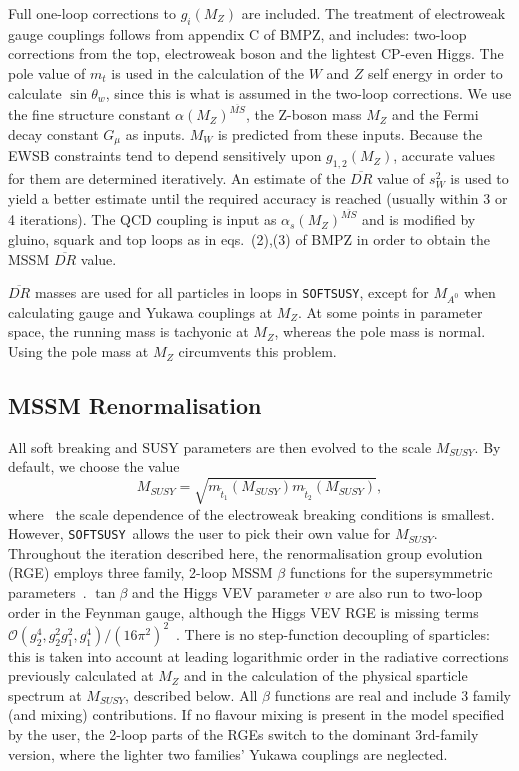 \documentclass{article}
\def\SOFTSUSY{{\tt SOFTSUSY}}
\begin{document}
Full one-loop corrections to $g_i(M_Z)$ are
included. 
The treatment of electroweak gauge couplings follows
from appendix C of BMPZ, and includes: two-loop corrections 
from the top, electroweak boson and the lightest CP-even Higgs. The pole value
of $m_t$ is used in the calculation of the $W$ and $Z$ self energy in order to
calculate $\sin \theta_w$, since this is what is assumed in the two-loop
corrections. 
We use the fine structure constant $\alpha(M_Z)^{\overline{MS}}$, the Z-boson
mass 
$M_Z$ and the Fermi decay constant $G_\mu$ as inputs. $M_W$ is predicted from
these inputs.
Because the EWSB constraints tend to 
depend sensitively upon $g_{1,2}(M_Z)$, accurate values for them are
determined iteratively. 
An estimate of the $\overline{DR}$ value of $s_W^2$ is used to yield a
better estimate until the required accuracy is reached (usually within 3 or
4 iterations).
The QCD coupling is input as $\alpha_s(M_Z)^{\overline{MS}}$ and
is modified by gluino, squark and top loops as in
eqs.~(2),(3) of BMPZ in order to obtain the MSSM $\overline{DR}$ value. 

$\overline{DR}$ masses are used for all particles in loops in \SOFTSUSY, except
for $M_{A^0}$ when calculating gauge and Yukawa couplings at $M_Z$. At some
points in parameter space, the running mass is tachyonic at $M_Z$, whereas the
pole mass is normal. Using the pole mass at $M_Z$ circumvents this problem.

\subsection{MSSM Renormalisation}

All soft breaking and SUSY parameters are then evolved to the scale
$M_{SUSY}$. By default, we choose the value
\begin{equation}
M_{SUSY} =\sqrt{m_{{\tilde t}_1}(M_{SUSY}) m_{{\tilde t}_2}(M_{SUSY})}, \label{msusy}
\end{equation}
where~\cite{Casas:1998vh} the scale dependence of the electroweak
breaking conditions is smallest. However, \SOFTSUSY~allows the user to pick
their own value for $M_{SUSY}$.
Throughout the iteration described here, the renormalisation group evolution
(RGE) employs three family,
2-loop MSSM $\beta$ functions for the supersymmetric
parameters~\cite{Barger:1994gh}.
$\tan \beta$ and the Higgs VEV
parameter $v$ are also run to two-loop order in the Feynman gauge, although
the Higgs VEV RGE is missing terms ${\mathcal O}(g_2^4, g_2^2 g_1^2,
g_1^4) / (16 \pi^2)^2$~\cite{Martin:2001vx,Yamada:2001ck}. 
There is no
step-function decoupling of sparticles: this is taken into account at leading
logarithmic order in the radiative corrections previously calculated at $M_Z$
and in the calculation of the physical sparticle spectrum at $M_{SUSY}$, described
below. All $\beta$ functions are real and include 3 family (and mixing)
contributions. If no flavour mixing is present in the model specified by the
user, the 2-loop parts of the RGEs switch to the dominant 3rd-family version,
where the lighter two families' Yukawa couplings are neglected.
\end{document}
